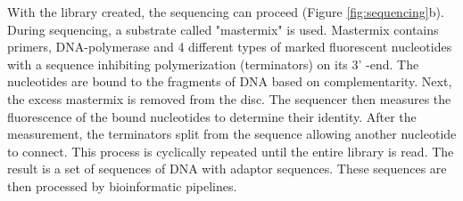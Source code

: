 With the library created, the sequencing can proceed (Figure \ref{fig:sequencing}b). During sequencing, a substrate called "mastermix" is used. Mastermix contains primers, DNA-polymerase and 4 different types of marked fluorescent nucleotides with a sequence inhibiting polymerization (terminators) on its 3' -end. The nucleotides are bound to the fragments of DNA based on complementarity. Next, the excess mastermix is removed from the disc. The sequencer then measures the fluorescence of the bound nucleotides to determine their identity. After the measurement, the terminators split from the sequence allowing another nucleotide to connect. This process is cyclically repeated until the entire library is read. The result is a set of sequences of DNA with adaptor sequences. These sequences are then processed by bioinformatic pipelines.
